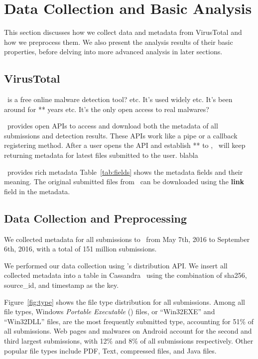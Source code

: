 \section{Data Collection and Basic Analysis}
\label{sec:meth}

This section discusses how we collect data and metadata from VirusTotal
and how we preprocess them.
We also present the analysis results of their basic properties, 
before delving into more advanced analysis in later sections.


\subsection{VirusTotal}
\vt\ is a free online malware detection tool? etc.
It's used widely etc.
It's been around for ** years etc.
It's the only open access to real malwares?

\vt\ provides open APIs to access and download both the metadata of all submissions and detection results.
These APIs work like a pipe or a callback registering method.
After a user opens the API and establish ** to \vt, \vt\ will keep returning metadata for latest files submitted to the user.
blabla

\vt\ provides rich metadata
Table~\ref{tab:fields} shows the metadata fields and their meaning.  
The original submitted files from \vt\ can be downloaded using the {\bf link} field in the metadata.

\subsection{Data Collection and Preprocessing}
We collected  metadata for all submissions to \vt\ from May 7th, 2016 to September 6th, 2016,
with a total of 151 million submissions. 

We performed our data collection using \vt{}’s distribution API.
We insert all collected metadata into a table in Cassandra~\cite{Cassandra} 
using the combination of sha256, source\_id, and timestamp as the key. 



Figure~\ref{fig:type} shows the file type distribution for all submissions. 
Among all file types, Windows \textit{Portable Executable} ({\em \pe}) files, or ``Win32EXE'' and ``Win32DLL'' files, 
are the most frequently submitted type,
accounting for 51\% of all submissions.
Web pages and malwares on Android account for the second and third largest submissions, 
with 12\% and 8\% of all submissions respectively. 
Other popular file types include PDF, Text, compressed files, and Java files. 

